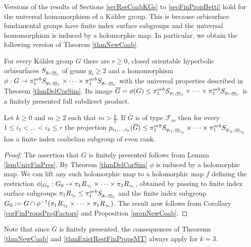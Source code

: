 Versions of the results of Sections \ref{secResCoabKGs} to \ref{secFinPropBetti} hold for the universal homomorphism of a K\"ahler group. This is because orbisurface fundamental groups have finite index surface subgroups and the universal homomorphism is induced by a holomorphic map. In particular, we obtain the following version of Theorem \ref{thmNewCoab}.

\begin{theorem}
 For every K\"ahler group $G$ there are $r\geq 0$, closed orientable hyperbolic orbisurfaces $S_{g_i,{\underline{m}}_i}$ of genus $g_i\geq 2$ and a homomorphism $\phi: G \rightarrow \pi_1^{orb} S_{g_1,{\underline{m}}_1}\times \dots \times \pi_1^{orb} S_{g_r,{\underline{m}}_r}$ with the universal properties described in Theorem \ref{thmDelCorSim}. Its image $\overline{G}=\phi(G)\leq \pi_1^{orb} S_{g_1,{\underline{m}}_1}\times \dots \times \pi_1^{orb} S_{g_r,{\underline{m}}_r}$ is a finitely presented full subdirect product. 
 
 Let $k\geq 0$ and $m\geq 2$ such that $m > \frac{k}{2}$. If $\overline{G}$ is of type $\mathcal{F}_m$ then for every $1\leq i_1 < \dots < i_k \leq r$ the projection $p_{i_1,\dots,i_k}(\overline{G})\leq \pi_1^{orb} S_{g_{i_1},{\underline{m}}_{i_1}}\times \dots \times \pi_1^{orb} S_{g_{i_k},{\underline{m}}_{i_k}}$ has a finite index coabelian subgroup of even rank.
 \label{thmExistRestFinPropsMT}
\end{theorem}

\begin{proof}
  The assertion that $\overline{G}$ is finitely presented follows from Lemma \ref{lemUnivFinPres}. By Theorem \ref{thmDelCorSim} $\phi$ is induced by a holomorphic map. We can lift any such holomorphic map to a holomorphic map $f$ defining the restriction  $\phi|_{G_0}: G_0 \rightarrow \pi_1 R_{\gamma_1}\times \dots \times \pi_1 R_{\gamma_r}$, obtained by passing to finite index surface subgroups $\pi_1 R_{\gamma_i}\leq \pi_1^{orb} S_{g_i,{\underline{m}}_i}$ and the finite index subgroup $G_0:= G \cap \phi^{-1}(\pi_1 R_{\gamma_1}\times \dots \times \pi_1 R_{\gamma_r})$. The result now follows from Corollary \ref{corFinPropsProjFactors} and Proposition \ref{propNewCoab}.   
\end{proof}

\begin{remark}
 Note that since $\overline{G}$ is finitely presented, the consequences of Theorems \ref{thmNewCoab} and \ref{thmExistRestFinPropsMT} always apply for $k=3$.
\end{remark}







